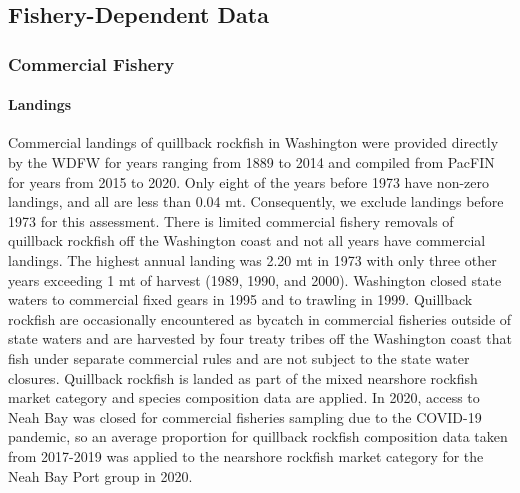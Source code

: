 \documentclass[11pt,
  english,
  a4paper,
]{article}
\begin{document}
\leavevmode\tagmcend\tagstructend\par


\hypertarget{fishery-dependent-data}{%
\subsection{Fishery-Dependent Data}\label{fishery-dependent-data}}

\leavevmode\tagmcend\tagstructend


\hypertarget{commercial-fishery}{%
\subsubsection{Commercial Fishery}\label{commercial-fishery}}

\leavevmode\tagmcend\tagstructend


\hypertarget{landings}{%
\paragraph{Landings}\label{landings}}

\leavevmode\tagmcend\tagstructend


Commercial landings of quillback rockfish in Washington were provided directly by the WDFW for years ranging from 1889 to 2014 and compiled from PacFIN for years from 2015 to 2020. Only eight of the years before 1973 have non-zero landings, and all are less than 0.04 mt. Consequently, we exclude landings before 1973 for this assessment. There is limited commercial fishery removals of quillback rockfish off the Washington coast and not all years have commercial landings. The highest annual landing was 2.20 mt in 1973 with only three other years exceeding 1 mt of harvest (1989, 1990, and 2000). Washington closed state waters to commercial fixed gears in 1995 and to trawling in 1999. Quillback rockfish are occasionally encountered as bycatch in commercial fisheries outside of state waters and are harvested by four treaty tribes off the Washington coast that fish under separate commercial rules and are not subject to the state water closures. Quillback rockfish is landed as part of the mixed nearshore rockfish market category and species composition data are applied. In 2020, access to Neah Bay was closed for commercial fisheries sampling due to the COVID-19 pandemic, so an average proportion for quillback rockfish composition data taken from 2017-2019 was applied to the nearshore rockfish market category for the Neah Bay Port group in 2020.
\end{document}
